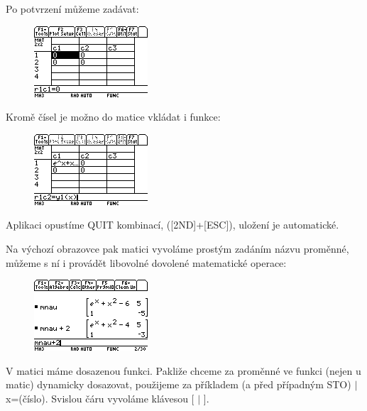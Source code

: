 \documentclass[10pt,a4paper,float]{article}
\begin{document}
Po potvrzení můžeme zadávat:

\begin{figure}[H]
	\centering
	\includegraphics[width=.5\textwidth]{img/MATRIXEDIT1}
\end{figure}

\pagebreak

Kromě čísel je možno do matice vkládat i funkce:
\begin{figure}[H]
	\centering
	\includegraphics[width=.5\textwidth]{img/MATRIXEDIT2}
\end{figure}

Aplikaci opustíme QUIT kombinací, ([2ND]+[ESC]), uložení je automatické.

Na výchozí obrazovce pak matici vyvoláme prostým zadáním názvu proměnné, můžeme s ní i provádět libovolné dovolené matematické operace:

\begin{figure}[H]
	\centering
	\includegraphics[width=.5\textwidth]{img/UZITIMATIC1}
\end{figure}

V matici máme dosazenou funkci. Pakliže chceme za proměnné ve funkci (nejen u matic) dynamicky dosazovat, použijeme za příkladem (a před případným STO) $\vert$x=(číslo). Svislou čáru vyvoláme klávesou [ $\vert$ ].
\end{document}
